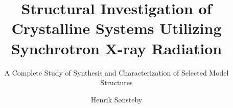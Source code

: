 \documentclass[a4paper]{report}
\title{Structural Investigation of Crystalline Systems 
       Utilizing Synchrotron X-ray Radiation}
\subtitle{A Complete Study of Synthesis and 
          Characterization of Selected Model Structures}
\author{Henrik S{\o}nsteby}
\begin{document}
    \mnfrontpage
\end{document}
